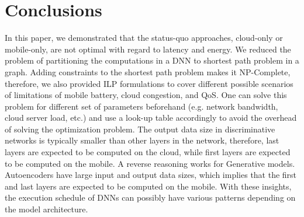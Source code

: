 \section{Conclusions}
In this paper, we demonstrated that the status-quo approaches, cloud-only or mobile-only, are not optimal with regard to latency and energy. We reduced the problem of partitioning the computations in a DNN to shortest path problem in a graph. Adding constraints to the shortest path problem makes it NP-Complete, therefore, we also provided ILP formulations to cover different possible scenarios of limitations of mobile battery, cloud congestion, and QoS. One can solve this problem for different set of parameters beforehand (e.g. network bandwidth, cloud server load, etc.) and use a look-up table accordingly to avoid the overhead of solving the optimization problem. The output data size in discriminative networks is typically smaller than other layers in the network, therefore, last layers are expected to be computed on the cloud, while first layers are expected to be computed on the mobile. A reverse reasoning works for Generative models. Autoencoders have large input and output data sizes, which implies that the first and last layers are expected to be computed on the mobile. With these insights, the execution schedule of DNNs can possibly have various patterns depending on the model architecture.

